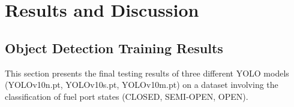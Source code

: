 \documentclass[12pt,oneside]{book} %
\begin{document}
\chapter{Results and Discussion}\label{chap:results}

\section{Object Detection Training Results}

This section presents the final testing results of three different YOLO models
(YOLOv10n.pt, YOLOv10s.pt, YOLOv10m.pt) on a dataset involving the
classification of fuel port states (CLOSED, SEMI-OPEN, OPEN).
\end{document}
